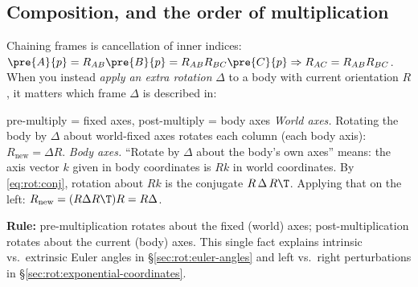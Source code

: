 \subsection{Composition, and the order of multiplication}\label{sec:rot:composition-order-multiplication}
Chaining frames is cancellation of inner indices: $\pre{A}{p}=R_{AB}\pre{B}{p}=R_{AB}R_{BC}\pre{C}{p}\Rightarrow R_{AC}=R_{AB}R_{BC}$. When you instead \emph{apply an extra rotation} $\Delta$ to a body with current orientation $R$, it matters which frame $\Delta$ is described in:
\begin{deriv}{pre-multiply = fixed axes, post-multiply = body axes}
\emph{World axes.} Rotating the body by $\Delta$ about world-fixed axes rotates each column (each body axis): $R_{\text{new}}=\Delta R$.
\emph{Body axes.} ``Rotate by $\Delta$ about the body's own axes'' means: the axis vector $k$ given in body coordinates is $Rk$ in world coordinates. By \eqref{eq:rot:conj}, rotation about $Rk$ is the conjugate $R\,\Delta\,R\T$. Applying that on the left: $R_{\text{new}}=(R\Delta R\T)R=R\Delta$.
\end{deriv}
\textbf{Rule:} pre-multiplication rotates about the fixed (world) axes; post-multiplication rotates about the current (body) axes. This single fact explains intrinsic vs.\ extrinsic Euler angles in \S\ref{sec:rot:euler-angles} and left vs.\ right perturbations in \S\ref{sec:rot:exponential-coordinates}.
